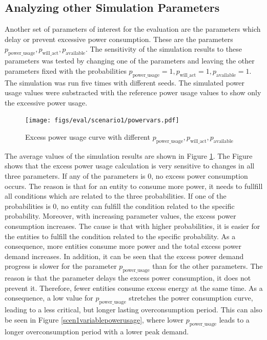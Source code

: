 \subsection{Analyzing other Simulation Parameters}

Another set of parameters of interest for the evaluation
are the parameters which delay or prevent excessive
power consumption. These are the parameters $p_{\mathrm{power\_usage}},
p_{\mathrm{will\_act}}, p_{\mathrm{available}}$.
The sensitivity of the simulation results to these parameters
was tested by changing one of the parameters and leaving 
the other parameters fixed with the probabilities
$p_{\mathrm{power\_usage}}=1,
p_{\mathrm{will\_act}}=1, p_{\mathrm{available}}=1$.
The simulation was run five times with different seeds.
The simulated power usage values were substracted with the 
reference power 
usage values to show only the excessive power usage.

\begin{figure}[!ht]
    \centering
    \texttt{[image: figs/eval/scenario1/powervars.pdf]}
    \caption{Excess power usage curve with different 
    $p_{\mathrm{power\_usage}}, p_{\mathrm{will\_act}}, 
    p_{\mathrm{available}}$}
    \label{scen1variablepowervals} 
\end{figure}

The average values of the simulation results are shown in 
Figure \ref{scen1variablepowervals}. The Figure shows that
the excess power usage calculation 
is very sensitive to changes in all
three parameters. If any of the parameters is $0$, no
excess power consumption occurs. The reason is that 
for an entity to consume more power, it needs to fullfill
all conditions which are related to the three 
probabilities. If one of the probabilities is $0$, 
no entity can fulfill the condition related to the 
specific probability. Moreover, with increasing parameter
values, the excess power consumption increases. The 
cause is that with higher probabilities, it is 
easier for the entities to fulfill the condition
related to the specific probability. As a 
consequence, more entities consume more 
power and the total excess power demand increases.
In addition, it can be seen that the excess power 
demand progress is slower for the parameter 
$p_{\mathrm{power\_usage}}$ than for the other parameters.
The reason is that the parameter delays the 
excess power consumption, it does not prevent it.
Therefore, fewer entities consume excess energy at the 
same time. As a consequence, 
a low value for $p_{\mathrm{power\_usage}}$
stretches the power consumption curve, leading
to a less critical, but longer lasting 
overconsumption period. This can also be seen in Figure 
\ref{scen1variablepowerusage}, where lower 
$p_{\mathrm{power\_usage}}$ leads to 
a longer overconsumption period with a lower peak demand.


